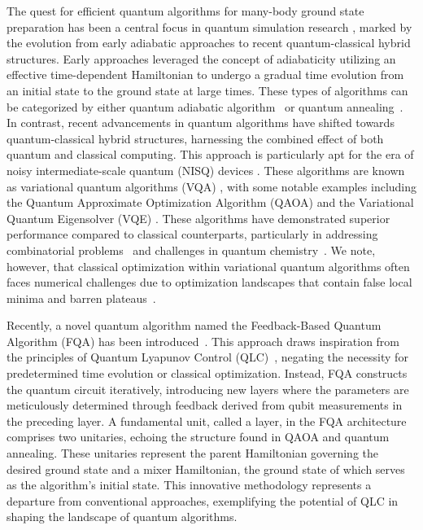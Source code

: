 \documentclass[twocolumn,aps,superscriptaddress,floatfix,longbibliography]{revtex4-2}
\begin{document}
The quest for efficient quantum algorithms for many-body ground
state preparation has been a central focus in quantum simulation
research \cite{Wocjan2009,tubman2018postponing,ge2019faster,
JBL:lin,wang2023ground}, marked by the evolution from early
adiabatic approaches to recent quantum-classical hybrid
structures. Early approaches leveraged the concept of
adiabaticity utilizing an effective time-dependent Hamiltonian
to undergo a gradual time evolution from an initial state to the
ground state at large times. These types of algorithms can be categorized by either quantum adiabatic algorithm~\cite{farhi2000quantum,
GordonScience2005,FarhiScience2001, RMDadiabatic2018} or
quantum annealing~\cite{finnila1994quantum, kadowaki1998quantum,
brooke1999quantum}. In contrast, recent advancements in quantum
algorithms have shifted towards quantum-classical hybrid
structures, harnessing the combined effect of both quantum and
classical computing. This approach is particularly apt for the
era of noisy intermediate-scale quantum (NISQ) devices
\cite{JBL:nisq}. These algorithms are known as variational
quantum algorithms (VQA) \cite{mcclean2016theory,
bravo2019variational, grimsley2019adaptive,
cerezo2021variational, PRXQuantum.2.010101, RMDKBharti2022},
with some notable examples including the Quantum Approximate
Optimization Algorithm (QAOA) \cite{QAOA, lloyd2018quantum,
dalzell2020many} and the Variational Quantum Eigensolver (VQE)
\cite{peruzzo2014variational, kandala2017hardware,
colless2018computation, tilly2022variational}. These algorithms
have demonstrated superior performance compared to classical
counterparts, particularly in addressing combinatorial
problems~\cite{zhou2020quantum, liu2022layer} and challenges in
quantum chemistry~\cite{peruzzo2014variational, cao2019quantum}.
We note, however, that classical optimization within variational
quantum algorithms often faces numerical challenges due to
optimization landscapes that contain false local  minima and
barren plateaus~\cite{chakrabarti2007quantum,
russell2017control, mcclean2018barren, wiersema2020exploring,
bittel2021training, larocca2022diagnosing}.

Recently, a novel quantum algorithm named the Feedback-Based
Quantum Algorithm (FQA) has been
introduced~\cite{FeedbackPRL,FeedbackPRA}. This approach draws
inspiration from the principles of Quantum Lyapunov Control
(QLC)~\cite{grivopoulos2003lyapunov,
QLC_Wang_2013}, negating the necessity for predetermined time
evolution or classical optimization. Instead, FQA constructs the
quantum circuit iteratively, introducing new layers where the
parameters are meticulously determined through %
feedback derived from qubit measurements in the preceding layer. A fundamental
unit, called a layer, in the FQA architecture comprises two
unitaries, echoing the structure found in QAOA and quantum
annealing. These unitaries represent the parent Hamiltonian
governing the desired ground state and a mixer Hamiltonian, the
ground state of which serves as the algorithm's initial state.
This innovative methodology represents a departure from
conventional approaches, exemplifying the potential of QLC in
shaping the landscape of quantum algorithms.
\end{document}
